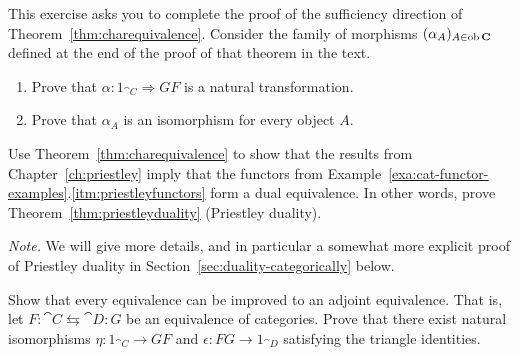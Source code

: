 \begin{exercise}\label{exe:sufequivalence-alpha}
  This exercise asks you to complete the proof of the sufficiency direction of Theorem~\ref{thm:charequivalence}. Consider the family of morphisms $(\alpha_A)_{A \in \operatorname{\mathrm{ob}} \mathbf{C}}$ defined at the end of the proof of that theorem in the text.
  \begin{enumerate}
  \item Prove that $\alpha \colon 1_{\cat{C}} \Rightarrow GF$ is a natural transformation.
    
  \item Prove that $\alpha_A$ is an isomorphism for every object $A$.
    

  \end{enumerate}
\end{exercise}

\begin{exercise}\label{exe:priestley-is-duality}
  Use Theorem~\ref{thm:charequivalence} to show that the results from Chapter~\ref{ch:priestley} imply that the functors from Example~\ref{exa:cat-functor-examples}.\ref{itm:priestleyfunctors} form a dual equivalence. In other words, prove Theorem~\ref{thm:priestleyduality} (Priestley duality).

  {\it Note.} We will give more details, and in particular a somewhat more explicit proof of Priestley duality in Section~\ref{sec:duality-categorically} below.
\end{exercise}

\begin{exercise}\label{exe:adjoint-equivalence}
  Show that every equivalence can be improved to an adjoint equivalence. That is, let $F \colon \cat{C} \leftrightarrows \cat{D} \colon G$ be an equivalence of categories. Prove that there exist natural isomorphisms $\eta \colon 1_{\cat{C}} \to GF$ and $\epsilon \colon FG \to 1_{\cat{D}}$ satisfying the triangle identities.
  
\end{exercise}

